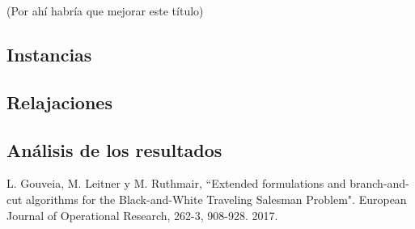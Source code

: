 \documentclass[10pt, a4paper]{article}
\begin{document}
(Por ahí habría que mejorar este título)

\subsection{Instancias}

\subsection{Relajaciones}

\subsection{Análisis de los resultados}

\pagebreak

\begin{thebibliography}{9}

L. Gouveia, M. Leitner y M. Ruthmair, “Extended formulations and branch-and-cut algorithms for the Black-and-White Traveling Salesman Problem". European Journal of Operational Research, 262-3, 908-928. 2017.

\end{thebibliography}
\end{document}
